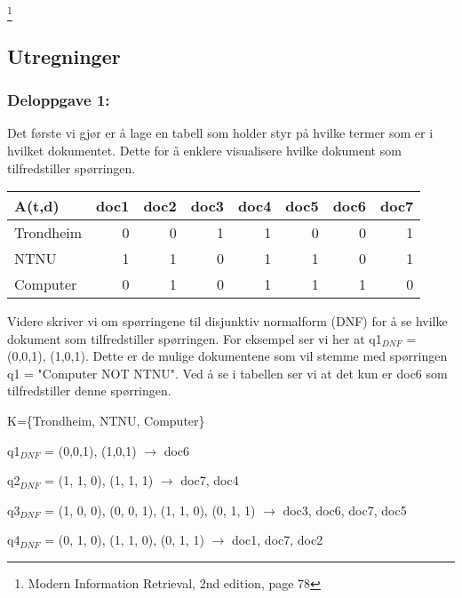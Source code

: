 \documentclass[]{article}
\begin{document}
\let\thefootnote\relax\footnote{Modern Information Retrieval, 2nd edition, page 78}
\pagebreak

\subsection{Utregninger}

\subsubsection{Deloppgave 1:}

Det første vi gjør er å lage en tabell som holder styr på hvilke termer som er i hvilket dokumentet. Dette for å enklere visualisere hvilke dokument som tilfredstiller spørringen. 

\vspace{2mm}

\begin{center}
    \begin{tabular}{|l|r|r|r|r|r|r|r|}
        \hline
        A(t,d)&doc1&doc2&doc3&doc4&doc5&doc6&doc7\\
        \hline
        Trondheim&0&0&1&1&0&0&1\\
        \hline
        NTNU&1&1&0&1&1&0&1\\
        \hline
        Computer&0&1&0&1&1&1&0\\
        \hline
    \end{tabular}
\end{center}

\vspace{5mm}

Videre skriver vi om spørringene til disjunktiv normalform (DNF) for å se hvilke dokument som tilfredstiller spørringen. For eksempel ser vi her at q1$_{DNF}$ = (0,0,1), (1,0,1). Dette er de mulige dokumentene som vil stemme med spørringen q1 = "Computer NOT NTNU". Ved å se i tabellen ser vi at det kun er doc6 som tilfredstiller denne spørringen.  


\vspace{5mm}

K=\{Trondheim, NTNU, Computer\}

q1$_{DNF}$ = (0,0,1), (1,0,1) $\rightarrow$ doc6

q2$_{DNF}$ = (1, 1, 0), (1, 1, 1) $\rightarrow$ doc7, doc4

q3$_{DNF}$ = (1, 0, 0), (0, 0, 1), (1, 1, 0), (0, 1, 1) $\rightarrow$ doc3, doc6, doc7, doc5

q4$_{DNF}$ = (0, 1, 0), (1, 1, 0), (0, 1, 1) $\rightarrow$ doc1, doc7, doc2
\end{document}

